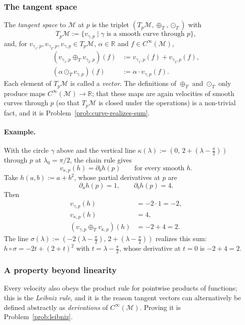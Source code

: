 \documentclass[11pt]{article}
\newcommand{\TpM}{T_p\mathcal M}
\newcommand{\Cinf}{C^\infty(\mathcal M)}
\begin{document}
\subsubsection*{The tangent space}
The \emph{tangent space} to $\mathcal M$ at $p$ is the triplet $(\TpM,\oplus_T,\odot_T)$ with
\[
\TpM:=\{v_{\gamma,p}\mid\gamma\text{ is a smooth curve through }p\},
\]
and, for $v_{\gamma_1,p},v_{\gamma_2,p},v_{\gamma,p}\in\TpM$, $\alpha\in\mathbb R$ and $f\in\Cinf$,
\begin{align*}
(v_{\gamma_1,p}\oplus_T v_{\gamma_2,p})(f)&:=v_{\gamma_1,p}(f)+v_{\gamma_2,p}(f),\\
(\alpha\odot_T v_{\gamma,p})(f)&:=\alpha\cdot v_{\gamma,p}(f).
\end{align*}
Each element of $\TpM$ is called a \emph{vector}. The definitions of $\oplus_T$ and $\odot_T$ only produce maps $\Cinf\to\mathbb R$; that these maps are again velocities of smooth curves through $p$ (so that $\TpM$ is closed under the operations) is a non-trivial fact, and it is Problem~\ref{prob:curve-realizes-sum}.

\paragraph{Example.} With the circle $\gamma$ above and the vertical line $\kappa(\lambda):=(0,\,2+(\lambda-\tfrac\pi2))$ through $p$ at $\lambda_0=\pi/2$, the chain rule gives
\[
v_{\kappa,p}(h)=\partial_bh(p)\qquad\text{for every smooth }h.
\]
Take $h(a,b):=a+b^2$, whose partial derivatives at $p$ are
\[
\partial_ah(p)=1,\qquad\partial_bh(p)=4.
\]
Then
\begin{align*}
v_{\gamma,p}(h)&=-2\cdot1=-2,\\
v_{\kappa,p}(h)&=4,\\
(v_{\gamma,p}\oplus_Tv_{\kappa,p})(h)&=-2+4=2.
\end{align*}
The line $\sigma(\lambda):=(-2(\lambda-\tfrac\pi2),\,2+(\lambda-\tfrac\pi2))$ realizes this sum: $h\circ\sigma=-2t+(2+t)^2$ with $t=\lambda-\tfrac\pi2$, whose derivative at $t=0$ is $-2+4=2$.

\subsubsection*{A property beyond linearity}
Every velocity also obeys the product rule for pointwise products of functions; this is the \emph{Leibniz rule}, and it is the reason tangent vectors can alternatively be defined abstractly as \emph{derivations} of $\Cinf$. Proving it is Problem~\ref{prob:leibniz}.
\end{document}
